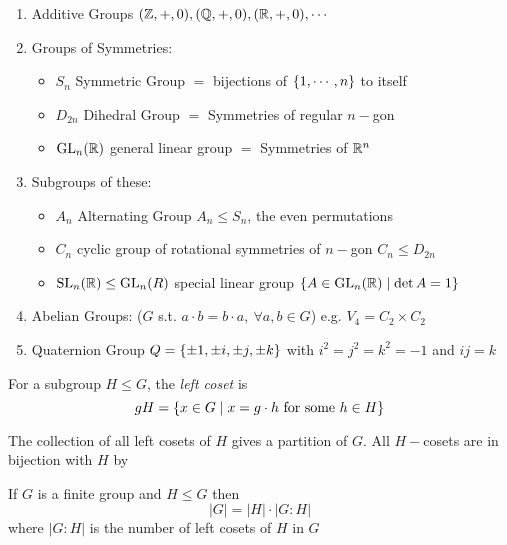\documentclass{article}
\begin{document}
\begin{eg}\leavevmode
    \begin{enumerate}
        \item Additive Groups $(\mathbb{Z}, +, 0), (\mathbb{Q}, +, 0), (\mathbb{R}, +, 0), \cdots$
        \item Groups of Symmetries: 
            \begin{itemize}
                \item $S_n$ Symmetric Group $=$ bijections of $\left\{ 1, \cdots, n \right\}$ to itself
                \item $D_{2n}$ Dihedral Group $=$ Symmetries of regular $n-$gon
                \item $\mathrm{GL}_n(\mathbb{R})$ general linear group $=$ Symmetries of $\mathbb{R}^n$
            \end{itemize}
        \item Subgroups of these: 
            \begin{itemize}
                \item $A_n$ Alternating Group $A_n \leq S_n$, the even permutations
                \item $C_n$ cyclic group of rotational symmetries of $n-$gon $C_n \leq D_{2n}$
                \item $\mathrm{SL}_n(\mathbb{R}) \leq \mathrm{GL}_n(R)$ special linear group $\left\{ A \in \mathrm{GL}_n(\mathbb{R}) \mid \det A = 1 \right\}$
            \end{itemize}
        \item Abelian Groups: ($G$ s.t. $a \cdot b = b \cdot a, \ \forall a, b \in G$) e.g. $V_4 = C_2 \times C_2$
        \item Quaternion Group $Q = \left\{ \pm 1, \pm i, \pm j, \pm k \right\}$ with $i^2 = j^2 = k^2 = -1$ and $ij = k$
    \end{enumerate}
\end{eg}
\begin{defi}
    For a subgroup $H \leq G$, the \emph{left coset} is $$ gH = \left\{ x \in G \mid x = g \cdot h \text{ for some } h \in H \right\}$$
\end{defi}

The collection of all left cosets of $H$ gives a partition of $G$.
All $H-$cosets are in bijection with $H$ by 

\begin{thm}[Lagrange]
    If $G$ is a finite group and $H \leq G$ then $$ |G| = |H| \cdot |G:H| $$ where $|G:H|$ is the number of left cosets of $H$ in $G$
\end{thm}
\end{document}
